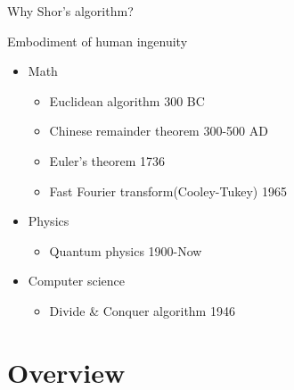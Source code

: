 \begin{frame}{Why Shor's algorithm?}

\begin{block}{Embodiment of human ingenuity}

\begin{itemize}
\itemsep1pt\parskip0pt
\item
  Math

  \begin{itemize}
  \itemsep1pt\parskip0pt
  \item
    Euclidean algorithm 300 BC
  \item
    Chinese remainder theorem 300-500 AD
  \item
    Euler's theorem 1736
  \item
    Fast Fourier transform(Cooley-Tukey) 1965
  \end{itemize}
\item
  Physics

  \begin{itemize}
  \itemsep1pt\parskip0pt
  \item
    Quantum physics 1900-Now
  \end{itemize}
\item
  Computer science

  \begin{itemize}
  \itemsep1pt\parskip0pt
  \item
    Divide \& Conquer algorithm 1946
  \end{itemize}
\end{itemize}

\end{block}

\end{frame}

\section{Overview}\label{overview}

